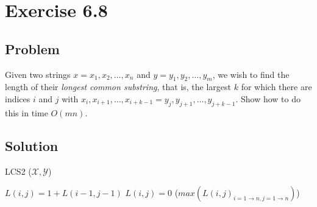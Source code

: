 \documentclass[12pt, letterpaper]{article}
\begin{document}
\section{Exercise 6.8}

\subsection{Problem}

Given two strings \(x = x_1, x_2, \dots, x_n\) and \(y = y_1, y_2, \dots, y_m\), we wish to find the length of their \emph{longest common substring}, that is, the largest \(k\) for which there are indices \(i\) and \(j\) with \(x_i, x_{i+1}, \dots, x_{i+k-1} = y_j, y_{j+1}, \dots, y_{j+k-1}\). Show how to do this in time \(O(mn)\).

\subsection{Solution}


\begin{algorithm}
    \caption{LCS2 (\(\mathcal{X, Y}\))}
    {
        {
            {
                \(L(i,j) = 1 + L(i-1, j-1)\)
            }
            {
                \(L(i,j) = 0\)
            }
        }
    }
    \Return(\(max(L(i,j)_{i=1 \to n,j=1 \to n})\))
\end{algorithm}
\end{document}
